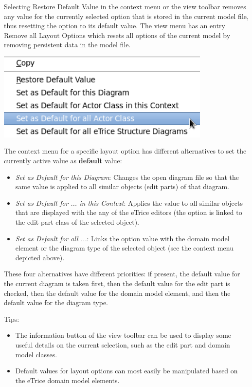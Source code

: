 Selecting Restore Default Value in the context menu or the view toolbar removes any value for the 
currently selected option that is stored in the current model file, thus resetting the option to its 
default value. The view menu has an entry Remove all Layout Options which resets all options of the 
current model by removing persistent data in the model file.

\includegraphics[width=0.8\textwidth]{images/043-ContextMenu.png}

The context menu for a specific layout option has different alternatives to set the currently active value 
as \textbf{default} value:
\begin{itemize}
\item \textit{Set as Default for this Diagram}: Changes the open diagram file so that the same value is 
applied to all similar objects (edit parts) of that diagram.

\item \textit{Set as Default for ... in this Context}: Applies the value to all similar objects that are 
displayed with the any of the eTrice editors (the option is linked to the edit part class of the selected 
object).

\item \textit{Set as Default for all ...}: Links the option value with the domain model element or the 
diagram type of the selected object (see the context menu depicted above).
\end{itemize}

These four alternatives have different priorities: if present, the default value for the current diagram 
is taken first, then the default value for the edit part is checked, then the default value for the domain 
model element, and then the default value for the diagram type.

Tips:
\begin{itemize}
\item The information button of the view toolbar can be used to display some useful details on the current 
selection, such as the edit part and domain model classes.
\item Default values for layout options can most easily be manipulated based on the eTrice domain model 
elements.
\end{itemize}

